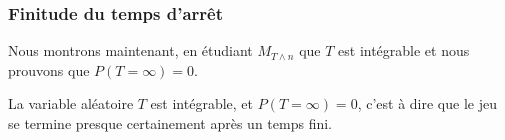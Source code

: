 \subsubsection{Finitude du temps d'arrêt}

Nous montrons maintenant, en étudiant \( M_{T\wedge n}\) que \( T\) est intégrable et nous prouvons que \( P(T=\infty)=0\).

\begin{proposition}
    La variable aléatoire \( T\) est intégrable, et \( P(T=\infty)=0\), c'est à dire que le jeu se termine presque certainement après un temps fini.
\end{proposition}

